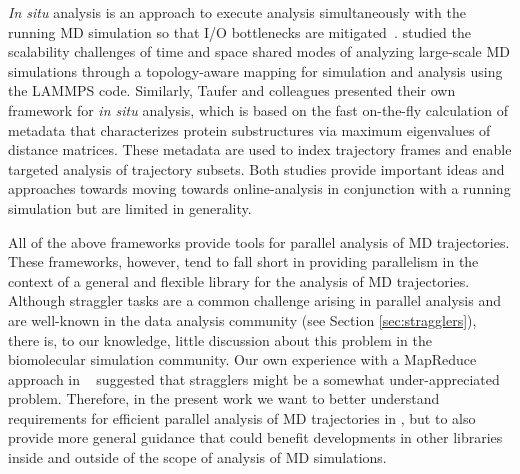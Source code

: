 \textit{In situ} analysis is an approach to execute analysis simultaneously with the running MD simulation so that I/O bottlenecks are  mitigated~\cite{Malakar-etal, Johnston:2017aa}.
\citet{Malakar-etal} studied the scalability challenges of time and space shared modes of analyzing large-scale MD simulations through a topology-aware mapping for simulation and analysis using the LAMMPS code.
Similarly, Taufer and colleagues \cite{Johnston:2017aa} presented their own framework for \textit{in situ} analysis, which is based on the fast on-the-fly calculation of metadata that characterizes protein substructures via maximum eigenvalues of distance matrices.
These metadata are used to index trajectory frames and enable targeted analysis of trajectory subsets.
Both studies provide important ideas and approaches towards moving towards online-analysis in conjunction with a running simulation but are limited in generality.

All of the above frameworks provide tools for parallel analysis of MD trajectories. 
These frameworks, however, tend to fall short in providing parallelism in the context of a general and flexible library for the analysis of MD trajectories.
Although straggler tasks are a common challenge arising in parallel analysis and are well-known in the data analysis community (see Section \ref{sec:stragglers}), there is, to our knowledge, little discussion about this problem in the biomolecular simulation community.
Our own experience with a MapReduce approach in ~\cite{Khoshlessan:2017ab} suggested that stragglers might be a somewhat under-appreciated problem.
Therefore, in the present work we want to better understand requirements for efficient parallel analysis of MD trajectories in , but to also provide more general guidance that could benefit developments in other libraries inside and outside of the scope of analysis of MD simulations.




